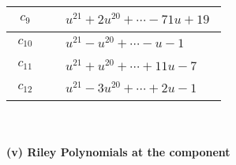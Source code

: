 \documentclass[1p]{elsarticle_modified}
\theoremstyle{definition}
\begin{document}
\begin{tabular}{m{50pt}|m{274pt}}
\hline $$\begin{aligned}c_{9}\end{aligned}$$&$\begin{aligned}
&u^{21}+2 u^{20}+\cdots-71 u+19
\end{aligned}$\\
\hline $$\begin{aligned}c_{10}\end{aligned}$$&$\begin{aligned}
&u^{21}- u^{20}+\cdots- u-1
\end{aligned}$\\
\hline $$\begin{aligned}c_{11}\end{aligned}$$&$\begin{aligned}
&u^{21}+u^{20}+\cdots+11 u-7
\end{aligned}$\\
\hline $$\begin{aligned}c_{12}\end{aligned}$$&$\begin{aligned}
&u^{21}-3 u^{20}+\cdots+2 u-1
\end{aligned}$\\
\hline
\end{tabular}\\~\\
\newpage\renewcommand{\arraystretch}{1}
\flushleft \textbf{(v) Riley Polynomials at the component}\newline \\
\end{document}
